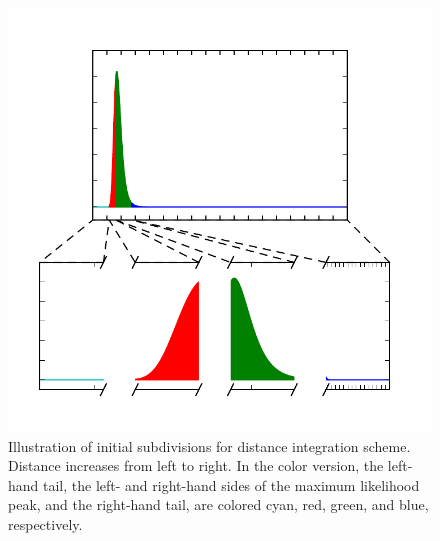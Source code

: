 \documentclass{iopart}
\begin{document}
\begin{figure}
    \caption{\label{fig:radial_integrand}Illustration of initial subdivisions for distance integration scheme. Distance increases from left to right. In the color version, the left\nobreakdashes-hand tail, the left\nobreakdashes- and right\nobreakdashes-hand sides of the maximum likelihood peak, and the right\nobreakdashes-hand tail, are colored cyan, red, green, and blue, respectively.}
    \begin{center}
        \includegraphics{radial_integrand}
    \end{center}
\end{figure}
\end{document}
